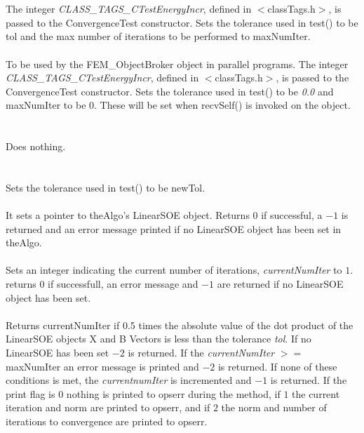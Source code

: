   \\
  \\
The integer {\em CLASS\_TAGS\_CTestEnergyIncr}, defined in
$<$classTags.h$>$, is passed to the ConvergenceTest constructor. Sets
the tolerance used in test() to be \p tol and the max number
of iterations to be performed to \p maxNumIter. \\

  \\
To be used by the FEM\_ObjectBroker object in parallel programs. The
integer {\em CLASS\_TAGS\_CTestEnergyIncr}, defined in
$<$classTags.h$>$, is passed to the ConvergenceTest constructor. Sets
the tolerance used in test() to be {\em 0.0} and \p maxNumIter 
to be $0$. These will be set when recvSelf() is invoked on the object. \\


 \\
 \\ 
Does nothing. \\

  \\
 \\
Sets the tolerance used in test() to be \p newTol. \\

 \\
It sets a pointer to \p theAlgo's LinearSOE object. Returns $0$ if
successful, a $-1$ is returned and an error message printed if no
LinearSOE object has been set in \p theAlgo. \\


 \\
Sets an integer indicating the current number of iterations, {\em
currentNumIter} to $1$. returns $0$ if successfull, an error message
and $-1$ are returned if no LinearSOE object has been set. \\

 \\
Returns {currentNumIter} if 0.5 times the absolute value of the dot product of
the LinearSOE objects X and B Vectors is less than the tolerance {\em
tol}. If no LinearSOE has been set $-2$ is returned. If the {\em
currentNumIter} $>=$ \p maxNumIter an error message is printed and
$-2$ is returned. If none of these conditions is met, the {\em
currentnumIter} is incremented and $-1$ is returned. If the print flag
is $0$ nothing is printed to 
opserr during the method, if $1$ the current iteration and norm are
printed to opserr, and if $2$ the norm and number of iterations to convergence
are printed to opserr. \\ 


